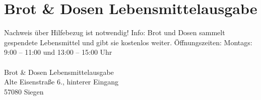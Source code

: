 \section{Brot \& Dosen Lebensmittelausgabe }
Nachweis über Hilfebezug ist notwendig! Info: Brot und Dosen sammelt gespendete Lebensmittel und gibt sie kostenlos weiter. Öffnungszeiten: Montags: 9:00 – 11:00 und 13:00 – 15:00 Uhr\\
\\
Brot \& Dosen Lebensmittelausgabe \\
Alte Eisenstraße 6., hinterer Eingang\\
57080 Siegen